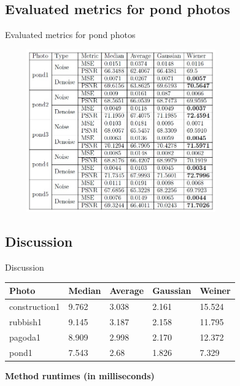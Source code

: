 \documentclass{beamer}
\begin{document}
\subsection{Evaluated metrics for pond photos}
\begin{frame}{Evaluated metrics for pond photos}
\begin{center}
\includegraphics[width=10cm,height=7cm]{pon1.jpg}
\end{center}
\end{frame}

\subsection{Discussion}
\begin{frame}{Discussion}
\begin{center}
	\begin{tabular}{| l | l | l | l | l |}
		\hline
		Photo 			& Median 	& Average 	& Gaussian 	& Weiner 	\\ \hline
		construction1	& 9.762		& 3.038		& 2.161		& 15.524	\\ \hline
		rubbish1		& 9.145		& 3.187		& 2.158		& 11.795	\\ \hline
		pagoda1			& 8.909		& 2.998		& 2.170		& 12.372	\\ \hline
		pond1			& 7.543		& 2.68		& 1.826		& 7.329		\\ \hline
	\end{tabular}



\textbf{Method runtimes (in milliseconds)}

\end{center}
\end{frame}
\end{document}
